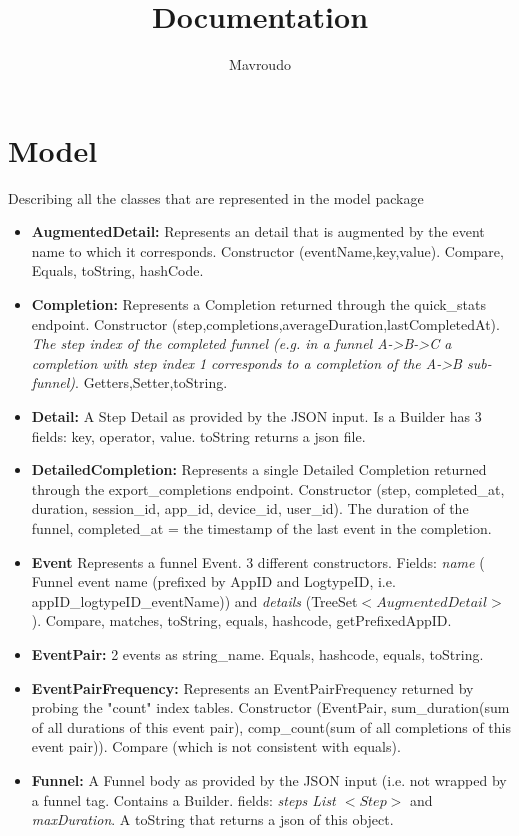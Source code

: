 \documentclass{article}
\title{Documentation}
\author{Mavroudo}
\begin{document}
\maketitle


\section{Model}
Describing all the classes that are represented in the model package
\begin{itemize}
	\item \textbf{AugmentedDetail:} Represents an detail that is augmented by the event name to which it corresponds. Constructor (eventName,key,value). Compare, Equals, toString, hashCode. 
	\item \textbf{Completion:} Represents a Completion returned through the quick\_stats endpoint. Constructor (step,completions,averageDuration,lastCompletedAt). \textit{The step index of the completed funnel (e.g. in a funnel A->B->C a completion with step index 1 corresponds to a completion of the A->B sub-funnel)}. Getters,Setter,toString.
	\item\textbf{Detail:} A Step Detail as provided by the JSON input. Is a Builder has 3 fields: key, operator, value. toString returns a json file.
	\item \textbf{DetailedCompletion:} Represents a single Detailed Completion returned through the export\_completions endpoint. Constructor (step, completed\_at, duration, session\_id, app\_id, device\_id, user\_id).
	The duration of the funnel, completed\_at = the timestamp of the last event in the completion.
	\item \textbf{Event} Represents a funnel Event. 3 different constructors. Fields: \textit{name} ( Funnel event name (prefixed by AppID and LogtypeID, i.e. appID\_logtypeID\_eventName)) and \textit{details} (TreeSet$<AugmentedDetail>$). Compare, matches, toString, equals, hashcode, getPrefixedAppID.
	\item \textbf{EventPair:} 2 events as string\_name. Equals, hashcode, equals, toString.
	\item \textbf{EventPairFrequency:} Represents an EventPairFrequency returned by probing the "count" index tables. Constructor (EventPair, sum\_duration(sum of all durations of this event pair), comp\_count(sum of all completions of this event pair)). Compare (which is not consistent with equals).
	\item \textbf{Funnel:} A Funnel body as provided by the JSON input (i.e. not wrapped by a funnel tag. Contains a Builder. fields: \textit{steps List $<Step>$} and \textit{maxDuration}. A toString that returns a json of this object.

\end{itemize}
\end{document}
